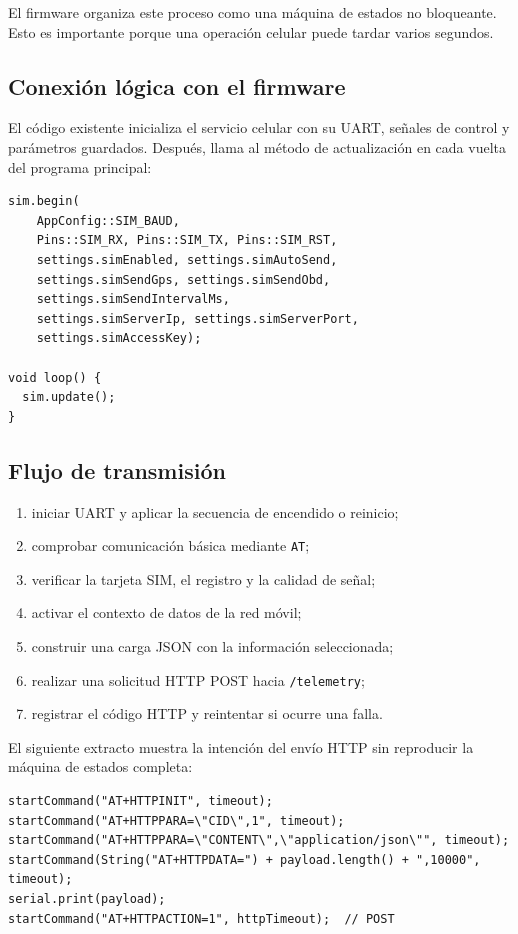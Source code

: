 \documentclass[11pt,letterpaper]{article}
\begin{document}
El firmware organiza este proceso como una máquina de estados no bloqueante.
Esto es importante porque una operación celular puede tardar varios segundos.

\subsection{Conexión lógica con el firmware}

El código existente inicializa el servicio celular con su UART, señales de
control y parámetros guardados. Después, llama al método de actualización en
cada vuelta del programa principal:

\begin{lstlisting}[style=roadcode,caption={Integración no bloqueante del servicio celular.}]
sim.begin(
    AppConfig::SIM_BAUD,
    Pins::SIM_RX, Pins::SIM_TX, Pins::SIM_RST,
    settings.simEnabled, settings.simAutoSend,
    settings.simSendGps, settings.simSendObd,
    settings.simSendIntervalMs,
    settings.simServerIp, settings.simServerPort,
    settings.simAccessKey);

void loop() {
  sim.update();
}
\end{lstlisting}


\subsection{Flujo de transmisión}

\begin{enumerate}
  \item iniciar UART y aplicar la secuencia de encendido o reinicio;
  \item comprobar comunicación básica mediante \texttt{AT};
  \item verificar la tarjeta SIM, el registro y la calidad de señal;
  \item activar el contexto de datos de la red móvil;
  \item construir una carga JSON con la información seleccionada;
  \item realizar una solicitud HTTP POST hacia \texttt{/telemetry};
  \item registrar el código HTTP y reintentar si ocurre una falla.
\end{enumerate}

El siguiente extracto muestra la intención del envío HTTP sin reproducir la
máquina de estados completa:

\begin{lstlisting}[style=roadcode,caption={Núcleo del envío HTTP del servicio celular.}]
startCommand("AT+HTTPINIT", timeout);
startCommand("AT+HTTPPARA=\"CID\",1", timeout);
startCommand("AT+HTTPPARA=\"CONTENT\",\"application/json\"", timeout);
startCommand(String("AT+HTTPDATA=") + payload.length() + ",10000", timeout);
serial.print(payload);
startCommand("AT+HTTPACTION=1", httpTimeout);  // POST
\end{lstlisting}
\end{document}
